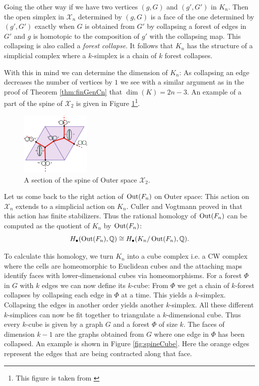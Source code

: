 Going the other way if we have two vertices $(g,G)$ and $(g',G')$ in $K_{n}$. Then the open simplex in $\mathcal{X}_{n}$ 
determined by $(g,G)$ is a face of  the one determined by $(g',G')$ exactly when $G$ is obtained from $G'$ 
by collapsing a forest of edges in $G'$ and  $g$ is homotopic to the composition of $g'$ with the collapsing map.
This collapsing is also called a \emph{forest collapse}.
It follows that $K_{n}$ has the structure of a simplicial complex where a $k$-simplex is a chain of $k$ forest collapses. 

With this in mind we can determine the dimension of $K_{n}$: As collapsing an edge decreases the number of vertices by $1$
we see with a similar argument as in the proof of Theorem \ref{thm:finGenCn} that $\dim(K) = 2n -3$.
An example of a part of the spine of $\mathcal{X}_{2}$ is given in Figure \ref{fig:SpineOfXn}\footnote{This figure is taken from \cite{vogtmann02}}. 

\begin{figure}[h]
	\centering
	\includegraphics[width=0.3\textwidth]{./Images/spineOfOuterSpace.pdf}
	\caption{A section of the spine of Outer space $\mathcal{X}_{2}$.}
	\label{fig:SpineOfXn}
\end{figure}

Let us come back to the right action of $\operatorname{Out}(F_{n})$ on Outer space: This action on $\mathcal{X}_{n}$ extends to a simplicial action on $K_{n}$.
Culler and Vogtmann proved in \cite{vogtmann86} that this action has finite stabilizers.
Thus the rational homology of $\operatorname{Out}(F_{n})$ can be computed as the quotient of $K_{n}$ by $\operatorname{Out}(F_{n})$:
\[
	H_{\bullet}(\operatorname{Out}(F_{n}),\mathbb{Q}) \cong H_{\bullet}(K_{n}/ \operatorname{Out}(F_{n}),\mathbb{Q})
.\] 

To calculate this homology, we turn $K_{n}$ into a cube complex i.e. a CW complex where the cells are homeomorphic
to Euclidean cubes and the attaching maps identify faces with lower-dimensional cubes via homeomorphisms.
For a forest $\Phi$ in $G$ with $k$ edges we can now define its $k$-cube:
From $\Phi$ we get a chain of $k$-forest collapses by collapsing each edge in $\Phi$ at a time.
This yields a $k$-simplex. Collapsing the edges in another order yields another $k$-simplex.
All these different $k$-simplices can now be fit together to triangulate a $k$-dimensional cube.
Thus every $k$-cube is given by a graph $G$ and a forest $\Phi$ of size $k$.
The faces of dimension $k-1$ are the graphs obtained from $G$ where one edge in $\Phi$ has been collapsed.
An example is shown in Figure \ref{fig:spineCube}. Here the orange edges represent the edges that are being contracted along that face.

